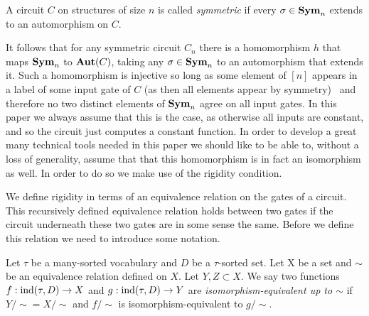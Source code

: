 \documentclass[../paper.tex]{subfiles}
\begin{document}
\begin{definition}[Symmetry]
  A circuit $C$ on structures of size $n$ is called \emph{symmetric} if every
  $\sigma \in \text{\textbf{Sym}}_n$ extends to an automorphism on $C$.
\end{definition}

It follows that for any symmetric circuit $C_n$ there is a homomorphism $h$ that
maps $\text{\textbf{Sym}}_n$ to $\text{\textbf{Aut}}(C)$, taking any $\sigma \in \text{\textbf{Sym}}_n$ to an automorphism
that extends it. Such a homomorphism is injective so long as some element of
$[n]$ appears in a label of some input gate of $C$ (as then all elements appear
by symmetry)~\cite{AndersonD17} and therefore no two distinct elements of
$\text{\textbf{Sym}}_n$ agree on all input gates. In this paper we always assume that this is
the case, as otherwise all inputs are constant, and so the circuit just computes
a constant function. In order to develop a great many technical tools needed in
this paper we should like to be able to, without a loss of generality, assume
that that this homomorphism is in fact an isomorphism as well. In order to do so
we make use of the rigidity condition.

We define rigidity in terms of an equivalence relation on the gates of a
circuit. This recursively defined equivalence relation holds between two gates
if the circuit underneath these two gates are in some sense the same. Before we
define this relation we need to introduce some notation.





\begin{definition}
  Let $\tau$ be a many-sorted vocabulary and $D$ be a $\tau$-sorted set. Let X
  be a set and $\sim$ be an equivalence relation defined on $X$. Let $Y, Z
  \subset X$. We say two functions $f : \text{\upshape ind}(\tau,D) \rightarrow X$ and $g :
  \text{\upshape ind}(\tau, D) \rightarrow Y$ are \emph{isomorphism-equivalent up to $\sim$} if
  $Y/{\sim} = X/{\sim}$ and $f/{\sim}$ is isomorphism-equivalent to $g/{\sim}$.
\end{definition}
\end{document}
